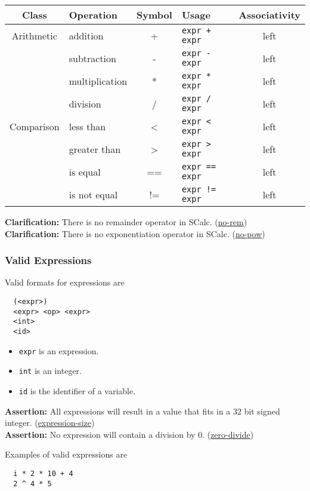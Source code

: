 \documentclass{article}
\newcommand{\code}[1]{\texttt{\textmd{#1}}}
\newcommand{\assertion}[2]{\textbf{Assertion: }#1 (\hyperlink{#2}{#2})}
\newcommand{\clarification}[2]{\textbf{Clarification: }#1 (\hyperlink{#2}{#2})}
\begin{document}
\begin{center}
  \begin{tabular}{|c|l|c|l|c|}
    \hline
    \textbf{Class} & \textbf{Operation} & \textbf{Symbol} & \textbf{Usage} &
    \textbf{Associativity} \\
    \hline
    Arithmetic
    &addition      & + & \texttt{expr + expr} & left \\
    &subtraction    & - & \texttt{expr - expr} & left \\
    &multiplication & * & \texttt{expr * expr} & left \\
    &division       & / & \texttt{expr / expr} & left \\
    \hline
    Comparison
    &less than      & <  & \texttt{expr < expr}  & left \\
    &greater than   & >  & \texttt{expr > expr}  & left \\
    &is equal       & == & \texttt{expr == expr} & left \\
    &is not equal   & != & \texttt{expr != expr} & left \\
    \hline
  \end{tabular}
\end{center}

\clarification{There is no remainder operator in SCalc.}{no-rem}\\
\clarification{There is no exponentiation operator in SCalc.}{no-pow}

\subsubsection{Valid Expressions}
Valid formats for expressions are
\begin{lstlisting}
  (<expr>)
  <expr> <op> <expr>
  <int>
  <id>
\end{lstlisting}

\begin{itemize}
  \item \code{expr} is an expression.
  \item \code{int} is an integer.
  \item \code{id} is the identifier of a variable.
\end{itemize}

\assertion{All expressions will result in a value that fits in a 32 bit signed integer.}
{expression-size}\\
\assertion{No expression will contain a division by 0.} {zero-divide}

Examples of valid expressions are
\begin{lstlisting}
  i * 2 * 10 + 4
  2 ^ 4 * 5
\end{lstlisting}
\end{document}
